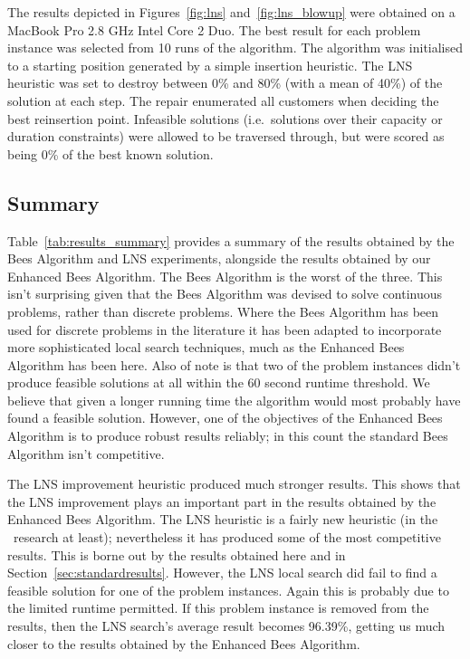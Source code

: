 
The results depicted in Figures~\ref{fig:lns} and~\ref{fig:lns_blowup} were obtained on a MacBook Pro 2.8 GHz Intel Core 2 Duo. The best result for each problem instance was selected from 10 runs of the algorithm. The algorithm was initialised to a starting position generated by a simple insertion heuristic. The LNS heuristic was set to destroy between 0\% and 80\% (with a mean of 40\%) of the solution at each step. The repair enumerated all customers when deciding the best reinsertion point. Infeasible solutions (i.e.~solutions over their capacity or duration constraints) were allowed to be traversed through, but were scored as being 0\% of the best known solution.

\subsection{Summary}

Table~\ref{tab:results_summary} provides a summary of the results obtained by the Bees Algorithm and LNS experiments, alongside the results obtained by our Enhanced Bees Algorithm. The Bees Algorithm is the worst of the three. This isn't surprising given that the Bees Algorithm was devised to solve continuous problems, rather than discrete problems. Where the Bees Algorithm has been used for discrete problems in the literature it has been adapted to incorporate more sophisticated local search techniques, much as the Enhanced Bees Algorithm has been here. Also of note is that two of the problem instances didn't produce feasible solutions at all within the 60 second runtime threshold. We believe that given a longer running time the algorithm would most probably have found a feasible solution. However, one of the objectives of the Enhanced Bees Algorithm is to produce robust results reliably; in this count the standard Bees Algorithm isn't competitive. 

The LNS improvement heuristic produced much stronger results. This shows that the LNS improvement plays an important part in the results obtained by the Enhanced Bees Algorithm. The LNS heuristic is a fairly new heuristic (in the \VRP\ research at least); nevertheless it has produced some of the most competitive results. This is borne out by the results obtained here and in Section~\ref{sec:standardresults}. However, the LNS local search did fail to find a feasible solution for one of the problem instances. Again this is probably due to the limited runtime permitted. If this problem instance is removed from the results, then the LNS search's average result becomes 96.39\%, getting us much closer to the results obtained by the Enhanced Bees Algorithm.

